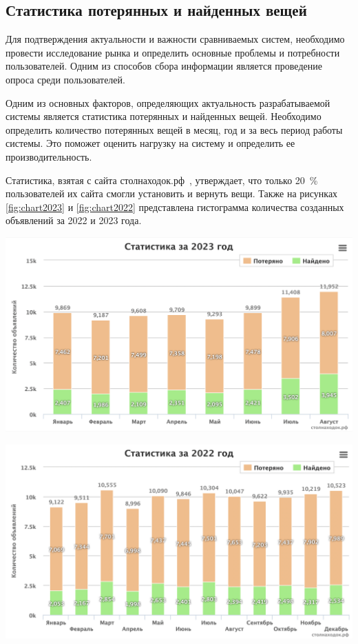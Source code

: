 \documentclass{mirea-article}
\newenvironment{Figure}
{\par\medskip\noindent\minipage{\linewidth}}
{\endminipage\par\medskip}
\begin{document}
	\subsection*{Статистика потерянных и найденных вещей}
	
	Для подтверждения актуальности и важности сравниваемых систем, необходимо провести исследование рынка и определить основные проблемы и потребности пользователей. Одним из способов сбора информации является проведение опроса среди пользователей.
	
	Одним из основных факторов, определяющих актуальность разрабатываемой системы является статистика потерянных и найденных вещей. Необходимо определить количество потерянных вещей в месяц, год и за весь период работы системы. Это поможет оценить нагрузку на систему и определить ее производительность.
	
	Статистика, взятая с сайта столнаходок.рф~\cite{bib:stol_nahodok}, утверждает, что только 20~\% пользователей их сайта смогли установить и вернуть вещи. Также на рисунках \ref{fig:chart2023} и \ref{fig:chart2022} представлена гистограмма количества созданных объявлений за 2022 и 2023 года.
	
	\begin{Figure}
		\centering
		\includegraphics[width=\textwidth]{../images/chart2023}
		\label{fig:chart2023}
	\end{Figure}
	
	\begin{Figure}
		\centering
		\includegraphics[width=\textwidth]{../images/chart2022}
		\label{fig:chart2022}
	\end{Figure}
	
\end{document}
